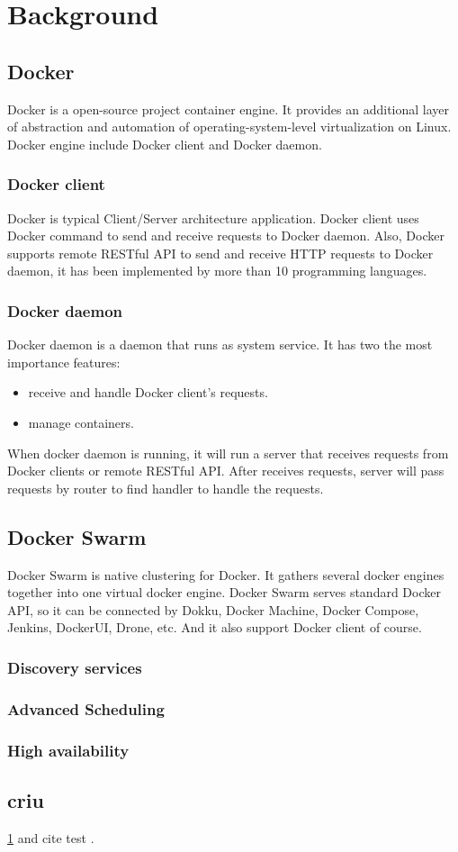 \chapter{Background}
\label{chap:background}
\section{Docker}
Docker is a open-source project container engine. It provides an additional layer of abstraction and automation of operating-system-level virtualization on Linux. Docker engine include Docker client and Docker daemon.
\subsection{Docker client}
Docker is typical Client/Server architecture application. Docker client uses Docker command to send and receive requests to Docker daemon. Also, Docker supports remote RESTful API to send and receive HTTP requests to Docker daemon, it has been implemented by more than 10 programming languages.
\subsection{Docker daemon}
Docker daemon is a daemon that runs as system service. It has two the most importance features: 
\begin{itemize}
    \item receive and handle Docker client's requests.
    \item manage containers.
\end{itemize}
When docker daemon is running, it will run a server that receives requests from Docker clients or remote RESTful API. After receives requests, server will pass requests by router to find handler to handle the requests.
\section{Docker Swarm}
Docker Swarm is native clustering for Docker. It gathers several docker engines together into  one virtual docker engine. Docker Swarm serves standard Docker API, so it can be connected by Dokku, Docker Machine, Docker Compose, Jenkins, DockerUI, Drone, etc. And it also support Docker client of course.
\subsection{Discovery services}
\subsection{Advanced Scheduling}
\subsection{High availability}

\section{criu}

\ref{chap:background} and cite test \cite{Knight:1986:AMF:319838.319854, Sohi:1995:MP:225830.224451, Hammond:1998:DSS:291069.291020}.